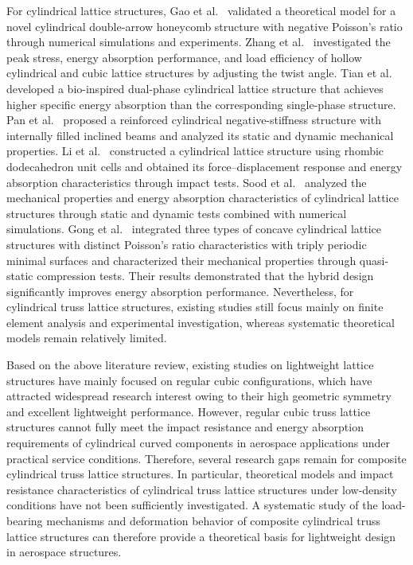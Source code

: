 \documentclass[12pt,a4paper]{article}
\begin{document}
	For cylindrical lattice structures, Gao et al.~\cite{Ref44} validated a theoretical model for a novel cylindrical double-arrow honeycomb structure with negative Poisson's ratio through numerical simulations and experiments. Zhang et al.~\cite{Ref45} investigated the peak stress, energy absorption performance, and load efficiency of hollow cylindrical and cubic lattice structures by adjusting the twist angle. Tian et al.~\cite{Ref46} developed a bio-inspired dual-phase cylindrical lattice structure that achieves higher specific energy absorption than the corresponding single-phase structure. Pan et al.~\cite{Ref47} proposed a reinforced cylindrical negative-stiffness structure with internally filled inclined beams and analyzed its static and dynamic mechanical properties. Li et al.~\cite{Ref48} constructed a cylindrical lattice structure using rhombic dodecahedron unit cells and obtained its force--displacement response and energy absorption characteristics through impact tests. Sood et al.~\cite{Ref49} analyzed the mechanical properties and energy absorption characteristics of cylindrical lattice structures through static and dynamic tests combined with numerical simulations. Gong et al.~\cite{Ref50} integrated three types of concave cylindrical lattice structures with distinct Poisson's ratio characteristics with triply periodic minimal surfaces and characterized their mechanical properties through quasi-static compression tests. Their results demonstrated that the hybrid design significantly improves energy absorption performance. Nevertheless, for cylindrical truss lattice structures, existing studies still focus mainly on finite element analysis and experimental investigation, whereas systematic theoretical models remain relatively limited.
	
	Based on the above literature review, existing studies on lightweight lattice structures have mainly focused on regular cubic configurations, which have attracted widespread research interest owing to their high geometric symmetry and excellent lightweight performance. However, regular cubic truss lattice structures cannot fully meet the impact resistance and energy absorption requirements of cylindrical curved components in aerospace applications under practical service conditions. Therefore, several research gaps remain for composite cylindrical truss lattice structures. In particular, theoretical models and impact resistance characteristics of cylindrical truss lattice structures under low-density conditions have not been sufficiently investigated. A systematic study of the load-bearing mechanisms and deformation behavior of composite cylindrical truss lattice structures can therefore provide a theoretical basis for lightweight design in aerospace structures.
	
\end{document}
